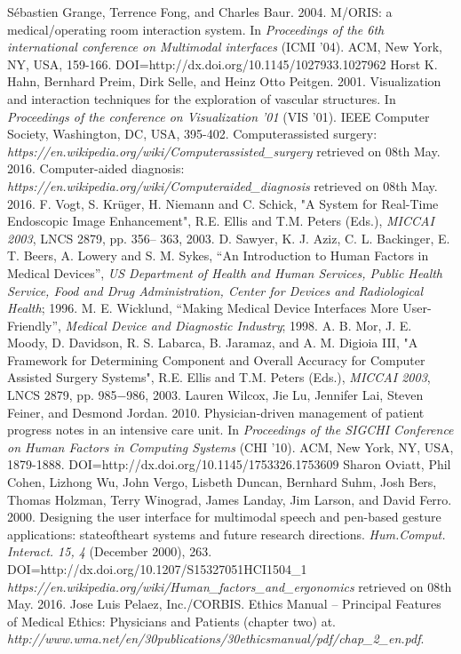 \begin{thebibliography}{}
\bibitem{} Sébastien Grange, Terrence Fong, and Charles Baur. 2004. M/ORIS: a medical/operating room interaction system. In \emph{Proceedings of the 6th international conference on Multimodal interfaces} (ICMI '04). ACM, New York, NY, USA, 159-166. DOI=http://dx.doi.org/10.1145/1027933.1027962
\bibitem{} Horst K. Hahn, Bernhard Preim, Dirk Selle, and Heinz Otto Peitgen. 2001. Visualization and interaction techniques for the exploration of vascular structures. In \emph{Proceedings of the conference on Visualization '01} (VIS '01). IEEE Computer Society, Washington, DC, USA, 395-402.
\bibitem{} Computer\-assisted surgery: \emph{https://en.wikipedia.org/wiki/Computer\-assisted\_surgery} retrieved on 08th May. 2016.
\bibitem{} Computer-aided diagnosis: \emph{https://en.wikipedia.org/wiki/Computer\-aided\_diagnosis} retrieved on 08th May. 2016.
\bibitem{} F. Vogt, S. Krüger, H. Niemann and C. Schick, "A System
for Real-Time Endoscopic Image Enhancement", R.E. Ellis
and T.M. Peters (Eds.), \emph{MICCAI 2003}, LNCS 2879, pp. 356–
363, 2003.
\bibitem{} D. Sawyer, K. J. Aziz, C. L. Backinger, E. T. Beers, A.
Lowery and S. M. Sykes, “An Introduction to Human
Factors in Medical Devices”, \emph{US Department of Health and
Human Services, Public Health Service, Food and Drug
Administration, Center for Devices and Radiological Health}; 1996.
\bibitem{} M. E. Wicklund, “Making Medical Device Interfaces More
User-Friendly”, \emph{Medical Device and Diagnostic Industry}; 1998.
\bibitem{} A. B. Mor, J. E. Moody, D. Davidson, R. S. Labarca, B.
Jaramaz, and A. M. Digioia III, "A Framework for
Determining Component and Overall Accuracy for
Computer Assisted Surgery Systems", R.E. Ellis and T.M.
Peters (Eds.), \emph{MICCAI 2003}, LNCS 2879, pp. 985−986,
2003.
\bibitem{} Lauren Wilcox, Jie Lu, Jennifer Lai, Steven Feiner, and Desmond Jordan. 2010. Physician-driven management of patient progress notes in an intensive care unit. In \emph{Proceedings of the SIGCHI Conference on Human Factors in Computing Systems} (CHI '10). ACM, New York, NY, USA, 1879-1888. DOI=http://dx.doi.org/10.1145/1753326.1753609
\bibitem{} Sharon Oviatt, Phil Cohen, Lizhong Wu, John Vergo, Lisbeth Duncan, Bernhard Suhm, Josh Bers, Thomas Holzman, Terry Winograd, James Landay, Jim Larson, and David Ferro. 2000. Designing the user interface for multimodal speech and pen-based gesture applications: state\-of\-the\-art systems and future research directions. \emph{Hum.\-Comput. Interact. 15, 4} (December 2000), 263. DOI=http://dx.doi.org/10.1207/S15327051HCI1504\_1
\bibitem{} \emph{https://en.wikipedia.org/wiki/Human\_factors\_and\_ergonomics} retrieved on 08th May. 2016.
\bibitem{} Jose Luis Pelaez, Inc./CORBIS. Ethics Manual – Principal Features of Medical Ethics: Physicians and Patients (chapter two) at. \emph{http://www.wma.net/en/30publications/30ethicsmanual/pdf/chap\_2\_en.pdf}.
\end{thebibliography}
